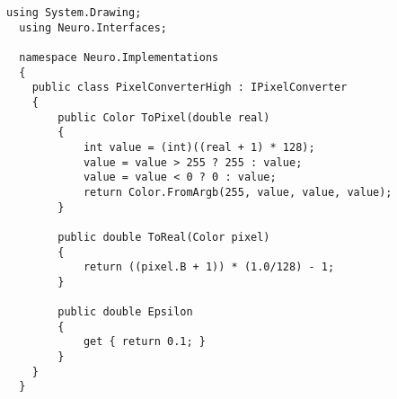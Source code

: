 
\begin{lstlisting}[style=csharpinlinestyle,caption={Дискретизатор глубиной 256 уровней}, label=lst:appendix:pixel_converter]
  using System.Drawing;
  using Neuro.Interfaces;

  namespace Neuro.Implementations
  {
  	public class PixelConverterHigh : IPixelConverter
  	{
  		public Color ToPixel(double real)
  		{
  			int value = (int)((real + 1) * 128);
  			value = value > 255 ? 255 : value;
  			value = value < 0 ? 0 : value;
  			return Color.FromArgb(255, value, value, value);
  		}

  		public double ToReal(Color pixel)
  		{
  			return ((pixel.B + 1)) * (1.0/128) - 1;
  		}

  		public double Epsilon
  		{
  			get { return 0.1; }
  		}
  	}
  }
\end{lstlisting}

